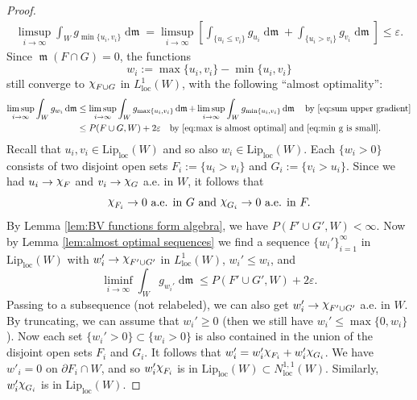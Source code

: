 \documentclass[11pt]{article}
\numberwithin{equation}{section}
\theoremstyle{plain}
\theoremstyle{definition}
\numberwithin{equation}{section}
\newcommand{\eps}{\varepsilon}
\newcommand{\loc}{\mathrm{loc}}
\newcommand{\liploc}{\mathrm{Lip}_{\mathrm{loc}}}
\newcommand{\ch}{\text{\raise 1.3pt \hbox{$\chi$}\kern-0.2pt}}
\DeclareMathOperator{\frm}{\mathfrak{m}}
\DeclareMathOperator{\dfrm}{d\mathfrak{m}}
\begin{document}
\begin{proof}
\begin{equation}\label{eq:min g is small}
\begin{split}
\limsup_{i\to\infty}\int_W g_{\min\{u_i,v_i\}}\dfrm
= \limsup_{i\to\infty}\left[\int_{\{u_i\le v_i\}} g_{u_i}\dfrm+\int_{\{u_i> v_i\}} g_{v_i}\dfrm\right]
\le \eps.
\end{split}
\end{equation}
Since  $\frm(F\cap G)=0$, the functions
\[
w_i:=\max\{u_i,v_i\}-\min\{u_i,v_i\}
\]
still converge to $\ch_{F\cup G}$ in $L_{\loc}^1(W)$, with the following ``almost optimality'':
\begin{equation}\label{eq:wi almost optimality}
\begin{split}
\limsup_{i\to\infty}\int_{W}g_{w_i}\dfrm
&\le \limsup_{i\to\infty}\int_{W}g_{\max\{u_i,v_i\}}\dfrm+\limsup_{i\to\infty}\int_{W}g_{\min\{u_i,v_i\}}\dfrm
\quad\textrm{by }\eqref{eq:sum upper gradient}\\
&\le P(F\cup G,W)+2\eps\quad\textrm{by }\eqref{eq:max is almost optimal}\textrm{ and }\eqref{eq:min g is small}.
\end{split}
\end{equation}
Recall that $u_i,v_i\in\liploc(W)$ and so also $w_i\in\liploc(W)$.
Each $\{w_i>0\}$ consists of two disjoint open sets $F_i:=\{u_i>v_i\}$ and $G_i:=\{v_i>u_i\}$.
Since we had $u_i\to \ch_F$ and $v_i\to \ch_{G}$ a.e. in $W$, it follows that
\begin{equation}\label{eq:Fi WG}
\ch_{F_i}\to 0 \textrm{ a.e. in }G\textrm{ and }\ch_{G_i}\to 0 \textrm{ a.e. in }F.
\end{equation}
By Lemma \ref{lem:BV functions form algebra}, we have $P(F'\cup G',W)<\infty$.
Now by Lemma \ref{lem:almost optimal sequences} we find a sequence $\{w_i'\}_{i=1}^{\infty}$
in $\liploc(W)$ with $w_i'\to \ch_{F'\cup G'}$ in $L^1_{\loc}(W)$, $w_i'\le w_i$, and
\begin{equation}\label{eq:wi prime optimality}
\liminf_{i\to\infty}\int_{W}g_{w_i'}\dfrm\le P(F'\cup G',W)+2\eps.
\end{equation}
Passing to a subsequence (not relabeled), we can also get $w_i'\to \ch_{F'\cup G'}$ a.e. in $W$.
By truncating, we can assume that $w_i'\ge 0$
(then we still have $w_i'\le \max\{0,w_i\}$).
Now each set $\{w_i'>0\}\subset \{w_i>0\}$ is also contained in the union of the disjoint open sets $F_i$ and $G_i$.
It follows that $w'_i=w'_i \ch_{F_i} + w'_i \ch_{G_i}$.
We have $w'_i=0$ on $\partial F_i\cap W$, and so $w'_i \ch_{F_i}$ is in $\liploc(W)\subset N^{1,1}_{\loc}(W)$.
Similarly, $w'_i \ch_{G_i}$ is in $\liploc(W)$.

\end{proof}
\end{document}
